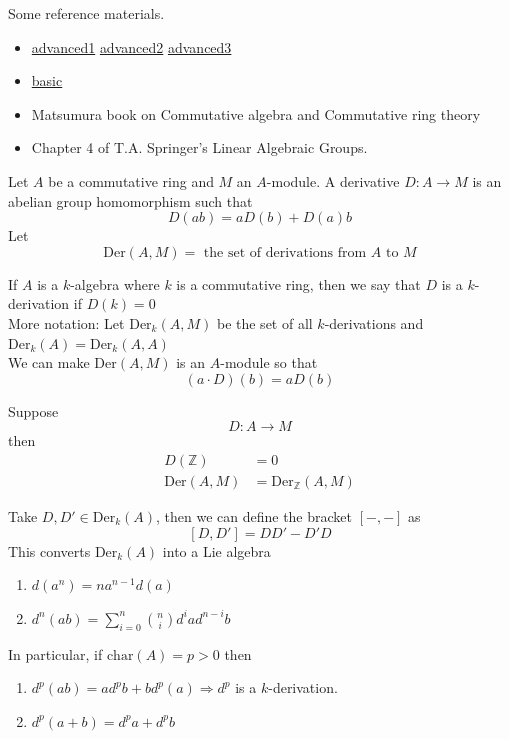\documentclass[oneside, 12pt, ]{scrbook}
\newcommand{\ZZ}{\mathbb Z}
\theoremstyle{theorem}
\begin{document}
Some reference materials. 
\begin{itemize}
\item \href{http://math.uchicago.edu/~amathew/chsmoothness.pdf}{advanced1} \href{http://therisingsea.org/notes/Section2.8-Differentials.pdf}{advanced2} \href{https://anagrams-seminar.github.io/hdr/kahler.pdf}{advanced3}
\item \href{http://people.math.sfu.ca/~kyeats/teaching/math800/MATH%20800%20-%20Final%20Project.pdf}{basic}
\item Matsumura book on Commutative algebra and Commutative ring theory
\item Chapter 4 of T.A. Springer's Linear Algebraic Groups.
\end{itemize}

Let $A$ be a commutative ring and $M$ an $A$-module. A derivative $D : A \rightarrow M$ is an abelian group homomorphism such that $$D(ab) = aD(b) + D(a)b$$
Let $$\mathrm{Der}(A,M) = \text{ the set of derivations from } A \text{ to } M$$

If $A$ is a $k$-algebra where $k$ is a commutative ring, then we say that $D$ is a $k$-derivation if $D(k)=0$ \\

More notation: Let $\mathrm{Der}_{k}(A,M)$ be the set of all $k$-derivations and $\mathrm{Der}_{k}(A) = \mathrm{Der}_{k}(A,A)$\\

We can make $\mathrm{Der}(A,M)$ is an $A$-module so that $$(a\cdot D)(b) = aD(b)$$

Suppose $$D: A \rightarrow M$$ then 
\begin{align*}
D(\ZZ) &= 0 \\
\mathrm{Der}(A,M) &= \mathrm{Der}_{\ZZ}(A,M)
\end{align*}

Take $D,D' \in \mathrm{Der}_{k}(A)$, then we can define the bracket $[-,-]$ as $$[D,D'] = DD' - D'D$$ This converts $\mathrm{Der}_{k}(A)$ into a Lie algebra 

\begin{remark}
\begin{enumerate}
\item $d(a^n) = na^{n-1}d(a)$
\item $d^{n}(ab) = \sum_{i=0}^{n} \binom{n}{i} d^{i} a d^{n-i} b$
\end{enumerate}
In particular, if $\mathrm{char}(A)=p > 0$ then 
\begin{enumerate}
\item $d^{p}(ab) = ad^{p}b + bd^{p}(a) \Rightarrow d^p$ is a $k$-derivation.
\item $d^{p}(a+b) = d^p a + d^p b$ 
\end{enumerate}
\end{remark}
\end{document}
